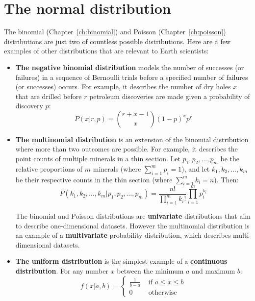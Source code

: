 \chapter{The normal distribution}
\label{ch:normal}

The binomial (Chapter~\ref{ch:binomial}) and Poisson
(Chapter~\ref{ch:poisson}) distributions are just two of countless
possible distributions.  Here are a few examples of other
distributions that are relevant to Earth scientists:

\begin{itemize}

\item{\bf The negative binomial distribution} models the number of
  successes (or failures) in a sequence of Bernoulli trials before a
  specified number of failures (or successes) occurs. For example, it
  describes the number of dry holes $x$ that are drilled before $r$
  petroleum discoveries are made given a probability of discovery $p$:
  \begin{equation}
    P(x|r,p) = \binom{r+x-1}{x} (1-p)^x p^r
  \end{equation}

\item{\bf The multinomial distribution} is an extension of the
  binomial distribution where more than two outcomes are possible. For
  example, it describes the point counts of multiple minerals in a
  thin section. Let $p_1,p_2,\ldots,p_m$ be the relative proportions
  of $m$ minerals (where $\sum_{i=1}^{m}p_i=1$), and let
  $k_1,k_2,\ldots,k_m$ be their respective counts in the thin section
  (where $\sum_{i=1}^{m}k_i=n$). Then:
  \begin{equation}
    P(k_1,k_2,\ldots,k_m|p_1,p_2,\ldots,p_m) =
    \frac{n!}{\prod\limits_{i=1}^{m}k_i!} \prod\limits_{i=1}^{m}p_i^{k_i}
  \end{equation}

  The binomial and Poisson distributions are \textbf{univariate}
  distributions that aim to describe one-dimensional datasets. However
  the multinomial distribution is an example of a
  \textbf{multivariate} probability distribution, which describes
  multi-dimensional datasets.

\item{\bf The uniform distribution} is the simplest example of a
  \textbf{continuous distribution}. For any number $x$ between the
  minimum $a$ and maximum $b$:
  \begin{equation}
    f(x|a,b) =
  \begin{cases}
       \frac{1}{b-a} & \mbox{~if~} a \leq x \leq b\\
       0 & \mbox{~otherwise}
  \end{cases}
  \end{equation}
  

\end{itemize}
